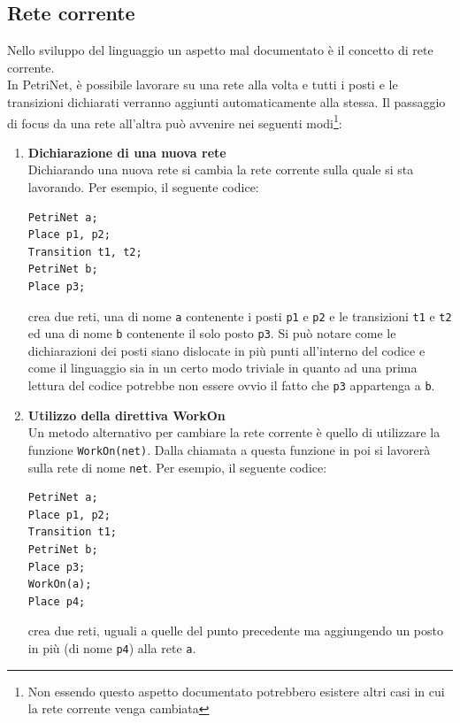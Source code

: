 \documentclass[italian,12pt]{book}
\begin{document}
\subsection{Rete corrente}\label{ssect:Rete_corrente_old}
Nello sviluppo del linguaggio un aspetto mal documentato è il concetto di rete corrente.\\
In PetriNet, è possibile lavorare su una rete alla volta e tutti i posti e le transizioni dichiarati 
verranno aggiunti automaticamente alla stessa. Il passaggio di focus da una rete all'altra 
può avvenire nei seguenti modi\footnote{Non essendo questo aspetto documentato potrebbero esistere 
altri casi in cui la rete corrente venga cambiata}:
\begin{enumerate}
  \item {\bf Dichiarazione di una nuova rete}\\
    Dichiarando una nuova rete si cambia la rete corrente sulla quale si sta lavorando.
    Per esempio, il seguente codice: 
\begin{verbatim}PetriNet a;
Place p1, p2;
Transition t1, t2;
PetriNet b;
Place p3;
\end{verbatim}
    crea due reti, una di nome {\tt a} contenente i posti {\tt p1} e {\tt p2} e le transizioni
    {\tt t1} e {\tt t2} ed una di nome {\tt b} contenente il solo posto {\tt p3}.
    Si può notare come le dichiarazioni dei posti siano dislocate in più punti all'interno del codice
    e come il linguaggio sia in un certo modo triviale in quanto ad una prima lettura del codice potrebbe
    non essere ovvio il fatto che {\tt p3} appartenga a {\tt b}.
  \item {\bf Utilizzo della direttiva WorkOn}\\
    Un metodo alternativo per cambiare la rete corrente è quello di utilizzare la funzione 
    {\tt WorkOn(net)}. Dalla chiamata a questa funzione in poi si lavorerà sulla rete
    di nome {\tt net}.
    Per esempio, il seguente codice:
\begin{verbatim}PetriNet a;
Place p1, p2;
Transition t1;
PetriNet b;
Place p3;
WorkOn(a);
Place p4;
\end{verbatim}
    crea due reti, uguali a quelle del punto precedente ma aggiungendo un posto in più (di nome {\tt p4})
    alla rete {\tt a}.
\end{enumerate}
\end{document}
